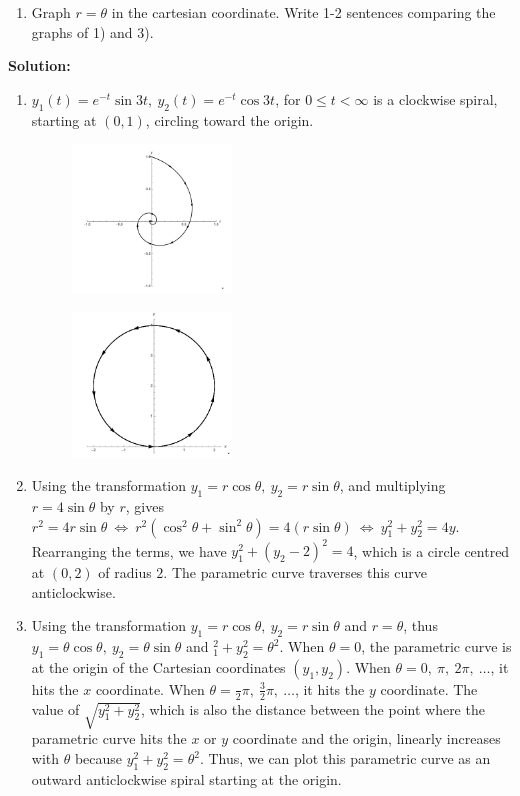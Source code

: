 \documentclass[11pt,a4paper]{article}
\begin{document}
\begin{enumerate}[\bfseries A.]
\begin{enumerate}[\bfseries 1)]
			\item Graph $r = \theta$ in the cartesian coordinate. Write 1-2 sentences comparing the graphs of 1) and 3).
		\end{enumerate}
		\textbf{Solution:}
		\begin{enumerate}[\bfseries 1)]
			\item $y_1(t) = e^{-t}\sin 3t,\ y_2(t) = e^{-t}\cos 3t$, for $0 \leq t < \infty$ is a clockwise spiral, starting at $(0,1)$, circling toward the origin.
			\begin{figure}[H]
				\centering
					\includegraphics[width=0.40\textwidth]{figure/figC1.PNG}
			\end{figure}
			\begin{figure}[H]
				\centering
					\includegraphics[width=0.40\textwidth]{figure/figC2.PNG}
			\end{figure}
			\item  Using the transformation $y_1 = r \cos \theta,\ y_2 = r \sin \theta$, and multiplying $r = 4 \sin \theta$ by $r$, gives $r^2 = 4r\sin \theta\ \Leftrightarrow\ r^2(\cos^2\theta + \sin^2\theta) = 4(r\sin \theta)\ \Leftrightarrow\ y_1^2 + y_2^2 = 4y$. Rearranging the terms, we have $y_1^2 + (y_2-2)^2=4$, which is a circle centred at $(0, 2)$ of radius $2$. The parametric curve traverses this curve anticlockwise.
			\item Using the transformation $y_1 = r \cos \theta,\ y_2 = r \sin \theta$ and $r = \theta$, thus $y_1 = \theta \cos \theta,\ y_2 = \theta \sin \theta$ and $_1^2+y_2^2 = \theta^2$. When $\theta = 0$, the parametric curve is at the origin of the  Cartesian coordinates $(y_1, y_2)$. When $\theta = 0,\ \pi,\ 2\pi,\ \ldots$, it hits the $x$ coordinate. When $\theta = \frac{}{2}\pi,\ \frac{3}{2}\pi,\ \ldots$, it hits the $y$ coordinate. The value of $\sqrt{y_1^2 + y_2^2}$, which is also the distance between the point where the parametric curve hits the $x$ or $y$ coordinate and the origin, linearly increases with $\theta$ because $y_1^2 + y_2^2 = \theta^2$. Thus, we can plot this parametric curve as an outward anticlockwise spiral starting at the origin.

\end{enumerate}
\end{enumerate}
\end{document}
